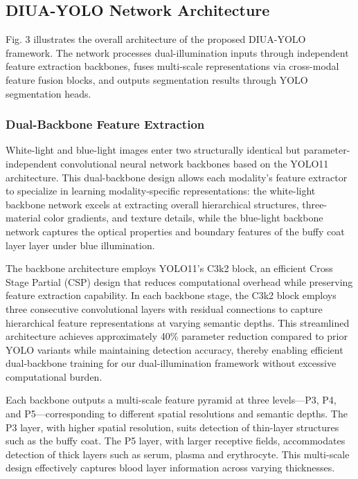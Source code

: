 \documentclass[journal,twoside,web]{ieeecolor}
\begin{document}
\subsection{DIUA-YOLO Network Architecture}

Fig. 3 illustrates the overall architecture of the proposed DIUA-YOLO framework. The network processes dual-illumination inputs through independent feature extraction backbones, fuses multi-scale representations via cross-modal feature fusion blocks, and outputs segmentation results through YOLO segmentation heads.

\subsubsection{Dual-Backbone Feature Extraction} White-light and blue-light images enter two structurally identical but parameter-independent convolutional neural network backbones based on the YOLO11 architecture. This dual-backbone design allows each modality's feature extractor to specialize in learning modality-specific representations: the white-light backbone network excels at extracting overall hierarchical structures, three-material color gradients, and texture details, while the blue-light backbone network captures the optical properties and boundary features of the buffy coat layer layer under blue illumination.

The backbone architecture employs YOLO11's C3k2 block, an efficient Cross Stage Partial (CSP) design that reduces computational overhead while preserving feature extraction capability. In each backbone stage, the C3k2 block employs three consecutive convolutional layers with residual connections to capture hierarchical feature representations at varying semantic depths. This streamlined architecture achieves approximately 40\% parameter reduction compared to prior YOLO variants while maintaining detection accuracy, thereby enabling efficient dual-backbone training for our dual-illumination framework without excessive computational burden.

Each backbone outputs a multi-scale feature pyramid at three levels—P3, P4, and P5—corresponding to different spatial resolutions and semantic depths. The P3 layer, with higher spatial resolution, suits detection of thin-layer structures such as the buffy coat. The P5 layer, with larger receptive fields, accommodates detection of thick layers such as serum, plasma and erythrocyte. This multi-scale design effectively captures blood layer information across varying thicknesses.
\end{document}
